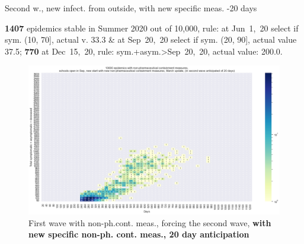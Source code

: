 \documentclass[8pt]{beamer}
\begin{document}
\begin{frame}{Second w., new infect. from outside, with new specific meas. -20 days}


\textbf{1407} {\tiny epidemics stable in Summer 2020 out of 10,000, rule: at Jun~1,~20 select if sym. (10, 70], actual v. 33.3 \& at Sep~20,~20 select if sym. (20, 90], actual value 37.5;} \textbf{770} {\tiny at Dec~15,~20, rule: sym.+asym.>Sep~20,~20, actual value: 200.0.}

\begin{figure}[H]
\center
\includegraphics[scale=0.17]{10kForceWave2Contr2M-20.png}
\caption{First wave with non-ph.cont. meas., forcing the second wave, \textbf{with new specific non-ph. cont. meas., 20 day anticipation}}
\label{selForceWave2Contr2M-20}
\end{figure}



\end{frame}
\end{document}
